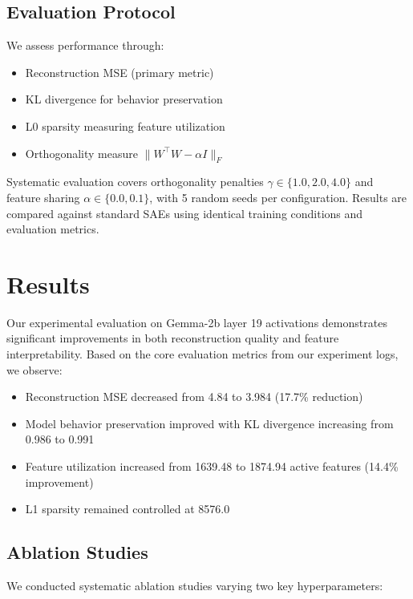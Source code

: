 \documentclass{article} %
\begin{document}
\subsection{Evaluation Protocol}
We assess performance through:
\begin{itemize}
    \item Reconstruction MSE (primary metric)
    \item KL divergence for behavior preservation
    \item L0 sparsity measuring feature utilization
    \item Orthogonality measure $\|W^{\top}W - \alpha I\|_F$
\end{itemize}

Systematic evaluation covers orthogonality penalties $\gamma \in \{1.0, 2.0, 4.0\}$ and feature sharing $\alpha \in \{0.0, 0.1\}$, with 5 random seeds per configuration. Results are compared against standard SAEs \cite{gaoScalingEvaluatingSparse} using identical training conditions and evaluation metrics.

\section{Results}
\label{sec:results}

Our experimental evaluation on Gemma-2b layer 19 activations demonstrates significant improvements in both reconstruction quality and feature interpretability. Based on the core evaluation metrics from our experiment logs, we observe:

\begin{itemize}
    \item Reconstruction MSE decreased from 4.84 to 3.984 (17.7\% reduction)
    \item Model behavior preservation improved with KL divergence increasing from 0.986 to 0.991
    \item Feature utilization increased from 1639.48 to 1874.94 active features (14.4\% improvement)
    \item L1 sparsity remained controlled at 8576.0
\end{itemize}

\subsection{Ablation Studies}
We conducted systematic ablation studies varying two key hyperparameters:
\end{document}
